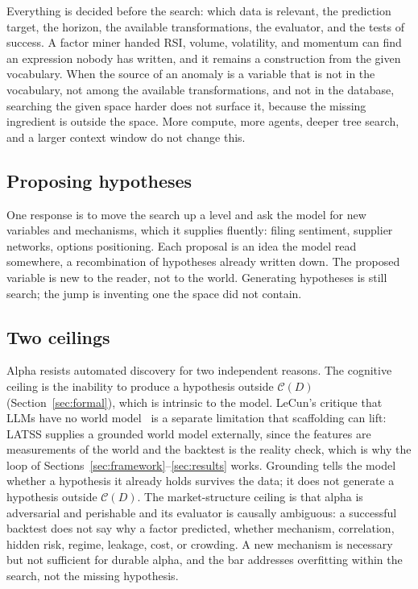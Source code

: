 \documentclass[11pt]{article}
\begin{document}
Everything is decided before the search: which data is relevant, the prediction target, the horizon,
the available transformations, the evaluator, and the tests of success. A factor miner handed RSI,
volume, volatility, and momentum can find an expression nobody has written, and it remains a
construction from the given vocabulary. When the source of an anomaly is a variable that is not in
the vocabulary, not among the available transformations, and not in the database, searching the given space
harder does not surface it, because the missing ingredient is outside the space. More compute, more
agents, deeper tree search, and a larger context window do not change this.

\subsection{Proposing hypotheses}

One response is to move the search up a level and ask the model for new variables and mechanisms,
which it supplies fluently: filing sentiment, supplier networks, options positioning. Each proposal
is an idea the model read somewhere, a recombination of hypotheses already written down. The proposed
variable is new to the reader, not to the world. Generating hypotheses is still search; the jump is
inventing one the space did not contain.

\subsection{Two ceilings}
\label{sec:two-ceilings}

Alpha resists automated discovery for two independent reasons. The cognitive ceiling is the inability
to produce a hypothesis outside $\mathcal{C}(D)$ (Section~\ref{sec:formal}), which is intrinsic to the
model. LeCun's critique that LLMs have no world model~\cite{lecun,lecunmtr} is a separate limitation
that scaffolding can lift: LATSS supplies a grounded world model externally, since the features are
measurements of the world and the backtest is the reality check, which is why the loop of
Sections~\ref{sec:framework}--\ref{sec:results} works. Grounding tells the model whether a hypothesis
it already holds survives the data; it does not generate a hypothesis outside $\mathcal{C}(D)$. The
market-structure ceiling is that alpha is adversarial and perishable and its evaluator is causally
ambiguous: a successful backtest does not say why a factor predicted, whether mechanism, correlation,
hidden risk, regime, leakage, cost, or crowding. A new mechanism is necessary but not sufficient for
durable alpha, and the bar addresses overfitting within the search, not the missing hypothesis.
\end{document}
